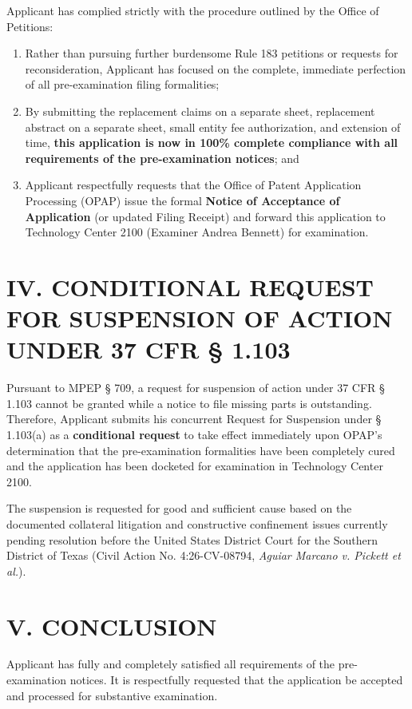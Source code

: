 \documentclass[11pt,letterpaper]{article}
\begin{document}
Applicant has complied strictly with the procedure outlined by the Office of Petitions:
\begin{enumerate}[leftmargin=2em, itemsep=2pt, parsep=0pt]
    \item Rather than pursuing further burdensome Rule 183 petitions or requests for reconsideration, Applicant has focused on the complete, immediate perfection of all pre-examination filing formalities;
    \item By submitting the replacement claims on a separate sheet, replacement abstract on a separate sheet, small entity fee authorization, and extension of time, \textbf{this application is now in 100\% complete compliance with all requirements of the pre-examination notices}; and
    \item Applicant respectfully requests that the Office of Patent Application Processing (OPAP) issue the formal \textbf{Notice of Acceptance of Application} (or updated Filing Receipt) and forward this application to Technology Center 2100 (Examiner Andrea Bennett) for examination.
\end{enumerate}

\section*{IV. CONDITIONAL REQUEST FOR SUSPENSION OF ACTION UNDER 37 CFR \S{} 1.103}

Pursuant to MPEP \S{} 709, a request for suspension of action under 37 CFR \S{} 1.103 cannot be granted while a notice to file missing parts is outstanding. Therefore, Applicant submits his concurrent Request for Suspension under \S{} 1.103(a) as a \textbf{conditional request} to take effect immediately upon OPAP's determination that the pre-examination formalities have been completely cured and the application has been docketed for examination in Technology Center 2100.

The suspension is requested for good and sufficient cause based on the documented collateral litigation and constructive confinement issues currently pending resolution before the United States District Court for the Southern District of Texas (Civil Action No. 4:26-CV-08794, \textit{Aguiar Marcano v. Pickett et al.}).

\section*{V. CONCLUSION}

Applicant has fully and completely satisfied all requirements of the pre-examination notices. It is respectfully requested that the application be accepted and processed for substantive examination.
\end{document}
